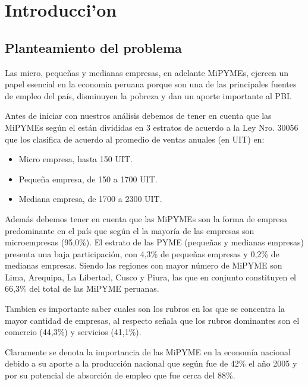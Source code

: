 
\chapter{Introducci'on}

\section{Planteamiento del problema}
Las micro, peque\~nas y medianas empresas, en adelante MiPYMEs, ejercen un papel
esencial en la economia peruana porque son una de las principales fuentes de empleo
del pa\'is, disminuyen la pobreza y dan un aporte importante al PBI.

Antes de iniciar con nuestros an\'alisis debemos de tener en cuenta que las MiPYMEs
seg\'un el \cite{produce2} est\'an divididas en 3 estratos de acuerdo
a la Ley Nro. 30056 que los clasifica de acuerdo al promedio de ventas anuales
(en UIT) en:
\begin{itemize}
  \item Micro empresa, hasta 150 UIT.
  \item Peque\~na empresa, de 150 a 1700 UIT.
  \item Mediana empresa, de 1700 a 2300 UIT.
\end{itemize}

Adem\'as debemos tener en cuenta que las MiPYMEs son la forma de empresa predominante
en el pa\'is que seg\'un el \cite{produce} la mayor\'ia de las empresas son
microempresas (95,0\%). El estrato de las PYME (peque\~nas y medianas empresas) presenta una baja participaci\'on,
con 4,3\% de peque\~nas empresas y 0,2\% de medianas empresas. Siendo las regiones
con mayor n\'umero de MiPYME son Lima, Arequipa, La Libertad, Cusco y Piura, las que
en conjunto constituyen el 66,3\% del total de las MiPYME peruanas.

Tambien es importante saber cuales son los rubros en los que se concentra la mayor cantidad de empresas,
al respecto \cite{produce} se\~nala que los rubros dominantes son el comercio (44,3\%) y servicios (41,1\%).

Claramente se denota la importancia de las MiPYME en la econom\'ia nacional debido a su aporte a la
producci\'on nacional que seg\'un \cite{arbulu} fue de 42\% el a\~no 2005 y por
su potencial de absorci\'on de empleo que fue cerca del 88\%.

